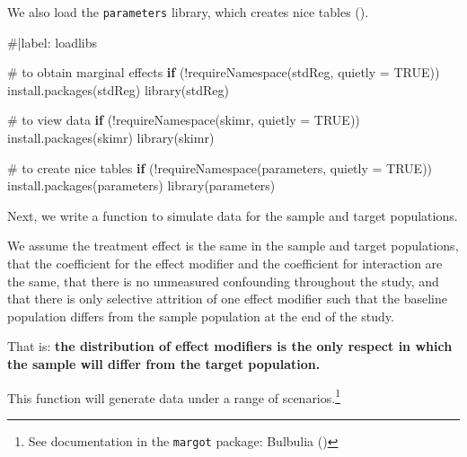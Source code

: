 \documentclass[
  single column]{article}
\newenvironment{Shaded}{\begin{snugshade}}{\end{snugshade}}
\newcommand{\AttributeTok}[1]{\textcolor[rgb]{0.40,0.45,0.13}{#1}}
\newcommand{\CommentTok}[1]{\textcolor[rgb]{0.37,0.37,0.37}{#1}}
\newcommand{\ConstantTok}[1]{\textcolor[rgb]{0.56,0.35,0.01}{#1}}
\newcommand{\ControlFlowTok}[1]{\textcolor[rgb]{0.00,0.23,0.31}{\textbf{#1}}}
\newcommand{\FunctionTok}[1]{\textcolor[rgb]{0.28,0.35,0.67}{#1}}
\newcommand{\NormalTok}[1]{\textcolor[rgb]{0.00,0.23,0.31}{#1}}
\newcommand{\SpecialCharTok}[1]{\textcolor[rgb]{0.37,0.37,0.37}{#1}}
\newcommand{\StringTok}[1]{\textcolor[rgb]{0.13,0.47,0.30}{#1}}
\begin{document}
We also load the \texttt{parameters} library, which creates nice tables
().

\begin{Shaded}
\begin{Highlighting}[]
\CommentTok{\#|label: loadlibs}

\CommentTok{\# to obtain marginal effects}
\ControlFlowTok{if}\NormalTok{ (}\SpecialCharTok{!}\FunctionTok{requireNamespace}\NormalTok{(}\StringTok{\textquotesingle{}stdReg\textquotesingle{}}\NormalTok{, }\AttributeTok{quietly =} \ConstantTok{TRUE}\NormalTok{)) }\FunctionTok{install.packages}\NormalTok{(}\StringTok{\textquotesingle{}stdReg\textquotesingle{}}\NormalTok{)}
\FunctionTok{library}\NormalTok{(stdReg)}

\CommentTok{\#  to view data}
\ControlFlowTok{if}\NormalTok{ (}\SpecialCharTok{!}\FunctionTok{requireNamespace}\NormalTok{(}\StringTok{\textquotesingle{}skimr\textquotesingle{}}\NormalTok{, }\AttributeTok{quietly =} \ConstantTok{TRUE}\NormalTok{)) }\FunctionTok{install.packages}\NormalTok{(}\StringTok{\textquotesingle{}skimr\textquotesingle{}}\NormalTok{)}
\FunctionTok{library}\NormalTok{(skimr)}

\CommentTok{\# to create nice tables}
\ControlFlowTok{if}\NormalTok{ (}\SpecialCharTok{!}\FunctionTok{requireNamespace}\NormalTok{(}\StringTok{\textquotesingle{}parameters\textquotesingle{}}\NormalTok{, }\AttributeTok{quietly =} \ConstantTok{TRUE}\NormalTok{)) }\FunctionTok{install.packages}\NormalTok{(}\StringTok{\textquotesingle{}parameters\textquotesingle{}}\NormalTok{)}
\FunctionTok{library}\NormalTok{(parameters)}
\end{Highlighting}
\end{Shaded}

Next, we write a function to simulate data for the sample and target
populations.

We assume the treatment effect is the same in the sample and target
populations, that the coefficient for the effect modifier and the
coefficient for interaction are the same, that there is no unmeasured
confounding throughout the study, and that there is only selective
attrition of one effect modifier such that the baseline population
differs from the sample population at the end of the study.

That is: \textbf{the distribution of effect modifiers is the only
respect in which the sample will differ from the target population.}

This function will generate data under a range of scenarios.\footnote{See
  documentation in the \texttt{margot} package: Bulbulia
  ()}
\end{document}
